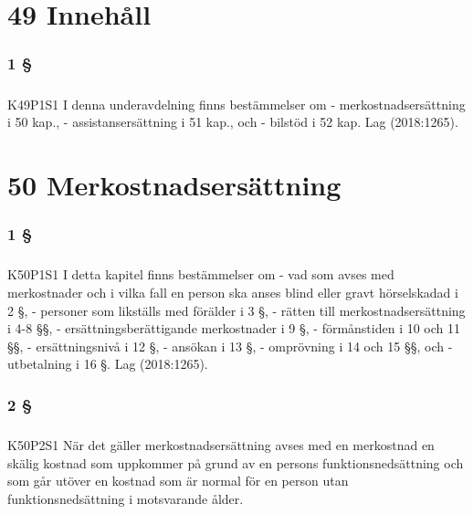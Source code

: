 \documentclass[a4paper,notitlepage,openany,10pt]{book}
\begin{document}
\chapter*{49 Innehåll}
\subsection*{1 §}
\paragraph*{}
{\tiny K49P1S1}
I denna underavdelning finns bestämmelser om
\newline - merkostnadsersättning i 50 kap.,
\newline - assistansersättning i 51 kap., och
\newline - bilstöd i 52 kap.
Lag (2018:1265).
\chapter*{50 Merkostnadsersättning}
\subsection*{1 §}
\paragraph*{}
{\tiny K50P1S1}
I detta kapitel finns bestämmelser om
\newline - vad som avses med merkostnader och i vilka fall en person ska anses blind eller gravt hörselskadad i 2 §,
\newline - personer som likställs med förälder i 3 §,
\newline - rätten till merkostnadsersättning i 4-8 §§,
\newline - ersättningsberättigande merkostnader i 9 §,
\newline - förmånstiden i 10 och 11 §§,
\newline - ersättningsnivå i 12 §,
\newline - ansökan i 13 §,
\newline - omprövning i 14 och 15 §§, och
\newline - utbetalning i 16 §.
Lag (2018:1265).
\subsection*{2 §}
\paragraph*{}
{\tiny K50P2S1}
När det gäller merkostnadsersättning avses med en merkostnad en skälig kostnad som uppkommer på grund av en persons funktionsnedsättning och som går utöver en kostnad som är normal för en person utan funktionsnedsättning i motsvarande ålder.
\end{document}
